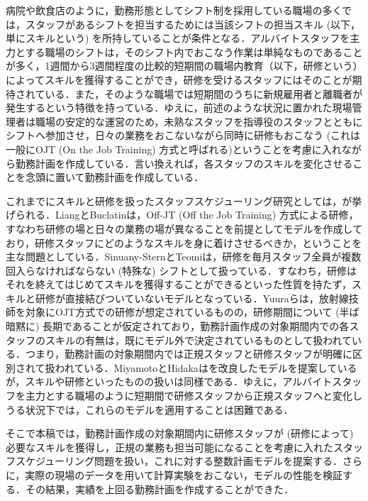\documentclass[11pt]{jsarticle}
\begin{document}
病院や飲食店のように，勤務形態としてシフト制を採用している職場の多くでは，スタッフがあるシフトを担当するためには当該シフトの担当スキル (以下，単にスキルという) を所持していることが条件となる．アルバイトスタッフを主力とする職場のシフトは，そのシフト内でおこなう作業は単純なものであることが多く，1週間から3週間程度の比較的短期間の職場内教育（以下，研修という）によってスキルを獲得することができ，研修を受けるスタッフにはそのことが期待されている．また，そのような職場では短期間のうちに新規雇用者と離職者が発生するという特徴を持っている．ゆえに，前述のような状況に置かれた現場管理者は職場の安定的な運営のため，未熟なスタッフを指導役のスタッフとともにシフトへ参加させ，日々の業務をおこないながら同時に研修もおこなう (これは一般にOJT (On the Job Training) 方式と呼ばれる\cite[pp.27-28]{bib:ojt})ということを考慮に入れながら勤務計画を作成している．言い換えれば，各スタッフのスキルを変化させることを念頭に置いて勤務計画を作成している．

これまでにスキルと研修を扱ったスタッフスケジューリング研究としては，\cite{bib:senkou_Off, bib:senkou2, bib:senkou_Israel, bib:senkou1}が挙げられる．LiangとBuclatin\cite{bib:senkou_Off}は，Off-JT (Off the Job Training) 方式による研修，すなわち研修の場と日々の業務の場が異なることを前提としてモデルを作成しており，研修スタッフにどのようなスキルを身に着けさせるべきか，ということを主な問題としている．Sinuany-SternとTeomi\cite{bib:senkou_Israel}は，研修を毎月スタッフ全員が複数回入らなければならない (特殊な) シフトとして扱っている．すなわち，研修はそれを終えてはじめてスキルを獲得することができるといった性質を持たず，スキルと研修が直接結びついていないモデルとなっている．Yuuraら\cite{bib:senkou1}は，放射線技師を対象にOJT方式での研修が想定されているものの，研修期間について (半ば暗黙に) 長期であることが仮定されており，勤務計画作成の対象期間内での各スタッフのスキルの有無は，既にモデル外で決定されているものとして扱われている．つまり，勤務計画の対象期間内では正規スタッフと研修スタッフが明確に区別されて扱われている．MiyamotoとHidaka\cite{bib:senkou2}は\cite{bib:senkou1}を改良したモデルを提案しているが，スキルや研修といったものの扱いは同様である．ゆえに，アルバイトスタッフを主力とする職場のように短期間で研修スタッフから正規スタッフへと変化しうる状況下では，これらのモデルを適用することは困難である．

そこで本稿では，勤務計画作成の対象期間内に研修スタッフが (研修によって) 必要なスキルを獲得し，正規の業務も担当可能になることを考慮に入れたスタッフスケジューリング問題を扱い，これに対する整数計画モデルを提案する．さらに，実際の現場のデータを用いて計算実験をおこない，モデルの性能を検証する．その結果，実績を上回る勤務計画を作成することができた．
\end{document}

